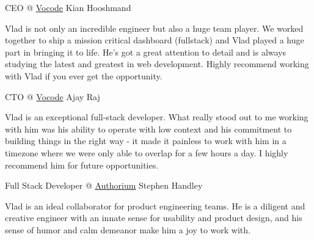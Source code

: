 

\begin{cventries}

  \cventry
    {CEO @ \href{https://vocode.dev}{Vocode}} %
    {Kian Hooshmand} %
    {} %
    {} %
    {
      \begin{cvitems} %
        Vlad is not only an incredible engineer but also a huge team player. We worked together to ship a mission critical dashboard (fullstack) and Vlad played a huge part in bringing it to life. He's got a great attention to detail and is always studying the latest and greatest in web development. Highly recommend working with Vlad if you ever get the opportunity.
      \end{cvitems}
    }

  \cventry
    {CTO @ \href{https://vocode.dev}{Vocode}} %
    {Ajay Raj} %
    {} %
    {} %
    {
      \begin{cvitems} %
        Vlad is an exceptional full-stack developer. What really stood out to me working with him was his ability to operate with low context and his commitment to building things in the right way - it made it painless to work with him in a timezone where we were only able to overlap for a few hours a day. I highly recommend him for future opportunities.
      \end{cvitems}
    }

  \cventry
    {Full Stack Developer @ \href{https://authorium.com}{Authorium}} %
    {Stephen Handley} %
    {} %
    {} %
    {
      \begin{cvitems} %
        Vlad is an ideal collaborator for product engineering teams. He is a diligent and creative engineer with 
        an innate sense for usability and product design, and his sense of humor and calm demeanor 
        make him a joy to work with.
      \end{cvitems}
    }


\end{cventries}
